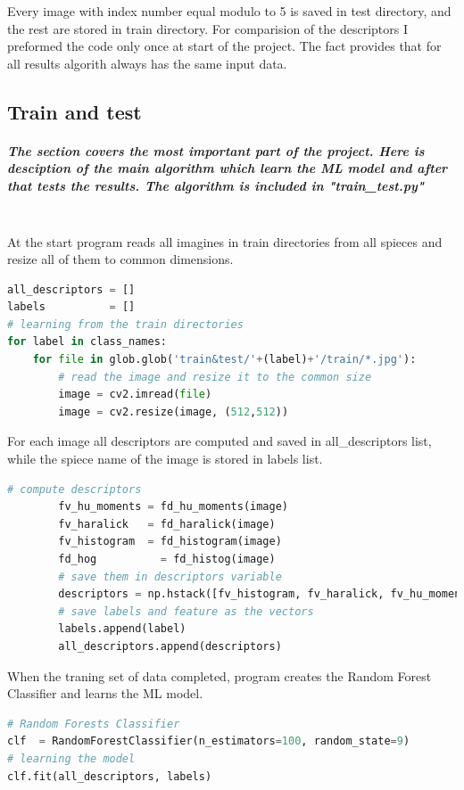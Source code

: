 \documentclass[12pt]{article}
\begin{document}
Every image with index number equal modulo to 5 is saved in test directory, and the rest are stored in train directory.
For comparision of the descriptors I preformed the code only once at start of the project. The fact provides that for all results algorith always has the same input data.


\subsection{Train and test}

\subparagraph{
The section covers the most important part of the project. Here is desciption of the main algorithm which learn the ML model and after that tests the results. The algorithm is included in "train\_test.py" \\\\
}

At the start program reads all imagines in train directories from all spieces and resize all of them to common dimensions.

\begin{lstlisting}[language=Python]
all_descriptors = []
labels          = []
# learning from the train directories
for label in class_names:
    for file in glob.glob('train&test/'+(label)+'/train/*.jpg'):
        # read the image and resize it to the common size
        image = cv2.imread(file)
        image = cv2.resize(image, (512,512))        
\end{lstlisting} 

For each image all descriptors are computed and saved in all\_descriptors list, while the spiece name of the image is stored in labels list.

\begin{lstlisting}[language=Python]
        # compute descriptors 
        fv_hu_moments = fd_hu_moments(image)
        fv_haralick   = fd_haralick(image)
        fv_histogram  = fd_histogram(image)
        fd_hog          = fd_histog(image)
        # save them in descriptors variable
        descriptors = np.hstack([fv_histogram, fv_haralick, fv_hu_moments, fd_hog])
        # save labels and feature as the vectors
        labels.append(label)
        all_descriptors.append(descriptors)
\end{lstlisting} 

When the traning set of data completed, program creates the Random Forest Classifier and learns the ML model.

\begin{lstlisting}[language=Python]
# Random Forests Classifier
clf  = RandomForestClassifier(n_estimators=100, random_state=9)
# learning the model
clf.fit(all_descriptors, labels)
\end{lstlisting} 
\end{document}
